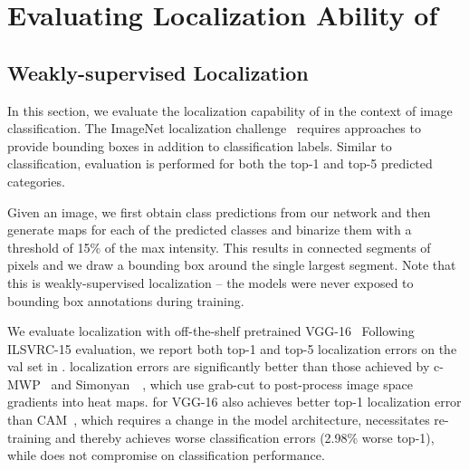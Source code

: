 \vspace{-10pt}
\section{Evaluating Localization Ability of \gcam{}}
\subsection{Weakly-supervised Localization}\label{sec:localization}
In this section, we evaluate the localization capability of \gcam{} in the context of image classification.
The ImageNet localization challenge~\cite{imagenet_cvpr09} requires
approaches to provide bounding boxes in addition to classification labels.
Similar to classification, evaluation is performed for both the top-1 and top-5 predicted categories.

Given an image, we first obtain class predictions from our network and
then generate \gcam{} maps for each of the predicted classes and binarize them with a
threshold of 15\% of the max intensity.
This results in connected segments of pixels and we draw a bounding box around
the single largest segment.
Note that this is weakly-supervised localization -- the models were never exposed
to bounding box annotations during training.

We evaluate \gcam{} localization with off-the-shelf pretrained VGG-16~\cite{simonyan_arxiv14} 
Following ILSVRC-15 evaluation, we report both top-1 and top-5 localization errors
on the val set in .
\gcam{} localization errors are significantly better than those achieved by
c-MWP~\cite{zhang2016top} and Simonyan~\etal~\cite{simonyan_arxiv13}, which use grab-cut to
post-process image space gradients into heat maps.
\gcam{} for VGG-16 also achieves better top-1 localization error than CAM~\cite{zhou_cvpr16}, which requires a change
in the model architecture, necessitates re-training and thereby achieves worse classification errors (2.98\%
worse top-1), while \gcam{} does not compromise on classification performance.



